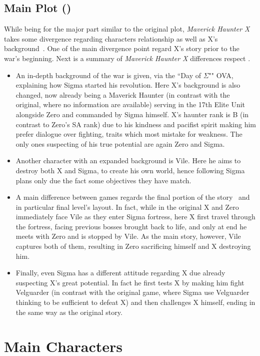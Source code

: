 \section{Main Plot (\mhx)}
While being for the major part similar to the original plot, \textit{Maverick Haunter X} takes some divergence regarding characters relationship as well as X's background~\cite{wiki:MM_MHX}. One of the main divergence point regard X's story prior to the war's beginning. Next is a summary of \textit{Maverick Haunter X} differences respect \x.
\begin{itemize}
	\item An in-depth background of the war is given, via the ``Day of $\Sigma$"" OVA, explaining how Sigma started his revolution. Here X's background is also changed, now already being a Maverick Haunter (in contrast with the original, where no information are available) serving in the 17th Elite Unit alongside Zero and commanded by Sigma himself. X's haunter rank is B (in contrast to Zero's SA rank) due to his kindness and pacifist spirit making him prefer dialogue over fighting, traits which most mistake for weakness. The only ones suspecting of his true potential are again Zero and Sigma. 
	
	\item Another character with an expanded background is Vile. Here he aims to destroy both X and Sigma, to create his own world, hence following Sigma plans only due the fact some objectives they have match.
	
	\item A main difference between games regards the final portion of the story~\cite{wiki:MM_MHX_script} and in particular final level's layout. In fact, while in the original X and Zero immediately face Vile as they enter Sigma fortress, here X first travel through the fortress, facing previous bosses brought back to life, and only at end he meets with Zero and is stopped by Vile. As the main story, however, Vile captures both of them, resulting in Zero sacrificing himself and X destroying him. 
	\item Finally, even Sigma has a different attitude regarding X due already suspecting X's great potential. In fact he first tests X by making him fight Velguarder (in contrast with the original game, where Sigma use Velguarder thinking to be sufficient to defeat X) and then challenges X himself, ending in the same way as the original story.	
\end{itemize}

\chapter{Main Characters}
